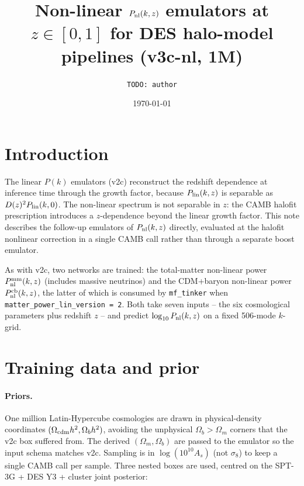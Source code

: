\documentclass[11pt]{article}
\title{Non-linear $P_{\rm nl}(k,z)$ emulators at $z\in[0,1]$ for DES
halo-model pipelines (v3c-nl, 1M)}
\author{\texttt{TODO: author}}
\date{\today}
\begin{document}
\maketitle

\section{Introduction}

The linear $P(k)$ emulators (v2c) reconstruct the redshift dependence
at inference time through the growth factor, because
$P_{\rm lin}(k,z)$ is separable as $D(z)^2 P_{\rm lin}(k,0)$. The
non-linear spectrum is not separable in $z$: the \textsc{CAMB}
halofit prescription introduces a $z$-dependence beyond the linear
growth factor. This note describes the follow-up emulators of
$P_{\rm nl}(k,z)$ directly, evaluated at the halofit nonlinear
correction in a single \textsc{CAMB} call rather than through a
separate boost emulator.

As with v2c, two networks are trained:
the total-matter non-linear power $P^{\rm mm}_{\rm nl}(k,z)$ (includes
massive neutrinos) and the CDM+baryon non-linear power
$P^{\rm cb}_{\rm nl}(k,z)$, the latter of which is consumed by
\texttt{mf\_tinker} when \texttt{matter\_power\_lin\_version = 2}. Both
take seven inputs -- the six cosmological parameters plus redshift $z$
-- and predict $\log_{10} P_{\rm nl}(k,z)$ on a fixed 506-mode $k$-grid.

\section{Training data and prior}
\label{sec:data}

\paragraph{Priors.} One million Latin-Hypercube cosmologies are drawn
in physical-density coordinates $(\Omega_{\rm cdm} h^2, \Omega_b h^2)$,
avoiding the unphysical $\Omega_b > \Omega_m$ corners that the v2c box
suffered from. The derived $(\Omega_m, \Omega_b)$ are passed to the
emulator so the input schema matches v2c. Sampling is in
$\log(10^{10} A_s)$ (not $\sigma_8$) to keep a single \textsc{CAMB}
call per sample. Three nested boxes are used, centred on the
SPT-3G + DES Y3 + cluster joint posterior:
\end{document}
